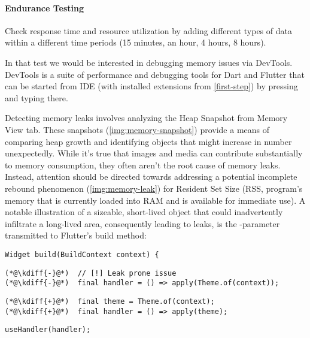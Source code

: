 \paragraph{Endurance Testing}
Check response time and resource utilization by adding different types of data within a different time 
periods (15 minutes, an hour, 4 hours, 8 hours).

In that test we would be interested in debugging memory issues via DevTools. DevTools is a suite of performance and 
debugging tools for Dart and Flutter that can be started from IDE (with installed extensions from \ref{first-step}) 
by pressing  and typing  there.

Detecting memory leaks involves analyzing the Heap Snapshot from Memory View tab. These snapshots 
(\cref{img:memory-snapshot}) provide a means of comparing heap growth and identifying objects that might increase in 
number unexpectedly. While it's true that images and media can contribute substantially to memory consumption, 
they often aren't the root cause of memory leaks. Instead, attention should be directed towards addressing a potential 
incomplete rebound phenomenon (\cref{img:memory-leak}) for Resident Set Size (RSS, program's memory that is currently 
loaded into RAM and is available for immediate use). A notable illustration of a sizeable, short-lived object that 
could inadvertently infiltrate a long-lived area, consequently leading to leaks, is the -parameter 
transmitted to Flutter's build method:

\begin{lstlisting}
Widget build(BuildContext context) {
\end{lstlisting}
{
\xpretocmd{\lstlisting}{\vspace{-12pt}}{}{}
\begin{lstlisting}[firstnumber=2, backgroundcolor=\color{backred}]
(*@\kdiff{-}@*)  // [!] Leak prone issue
(*@\kdiff{-}@*)  final handler = () => apply(Theme.of(context));
\end{lstlisting}
\begin{lstlisting}[firstnumber=2, backgroundcolor=\color{backgreen}]
(*@\kdiff{+}@*)  final theme = Theme.of(context);
(*@\kdiff{+}@*)  final handler = () => apply(theme);
\end{lstlisting}
\begin{lstlisting}[firstnumber=4]
   useHandler(handler);
\end{lstlisting}
}


